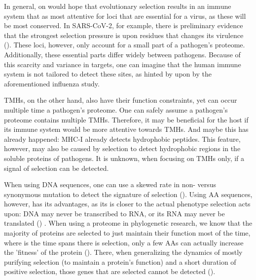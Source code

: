 In general, on would hope that evolutionary selection results in
an immune system that as most attentive for loci that are
essential for a virus, as these will be most conserved.
In SARS-CoV-2, for example, there is preliminary evidence that the strongest
selection pressure is upon residues that changes its 
virulence (\cite{velazquez2020positive}).
These loci, however, only account for a small part of a pathogen's proteome.
Additionally, these essential parts differ widely between pathogens.
Because of this scarcity and variance in targets, 
one can imagine that the human immune system 
is not tailored to detect these sites, 
as hinted by upon by the aforementioned influenza study.


TMHs, on the other hand, also have their function constraints, 
yet can occur multiple time a pathogen's proteome.
One can safely assume a pathogen's proteome contains multiple TMHs.
Therefore, it may be beneficial for the host
if its immune system would be more attentive towards TMHs.
And maybe this has already happened: MHC-I already detects hydrophobic
peptides. This feature, however, may also be caused by selection
to detect hydrophobic regions in the soluble proteins of pathogens.
It is unknown, when focusing on TMHs only, if a signal of selection
can be detected.


When using DNA sequences, one can use a skewed rate
in non- versus synonymous mutation
to detect the signature of selection (\cite{murrell2015gene}).
Using AA sequences, however, has its advantages,
as its is closer to the actual phenotype
selection acts upon: DNA may never be transcribed to RNA,
or its RNA may never be translated (\cite{diz2012proteomics})
.
When using a proteome in phylogenetic research,
we know that the majority of proteins are selected to just
maintain their function most of the time, where
is the time spans there is selection, only a few AAs
can actually increase the 'fitness' of the
protein (\cite{anisimova2009investigating}).
There, when generalizing the dynamics of mostly purifying selection (to maintain
a protein's function) and a short duration of positive selection,
those genes that are selected cannot be detected (\cite{yang2000statistical}).

